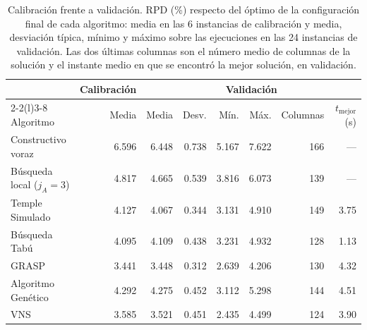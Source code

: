 \begin{table}[H]
\centering
\caption{Calibración frente a validación. RPD (\%) respecto del óptimo de la configuración final de cada algoritmo: media en las 6 instancias de calibración y media, desviación típica, mínimo y máximo sobre las ejecuciones en las 24 instancias de validación. Las dos últimas columnas son el número medio de columnas de la solución y el instante medio en que se encontró la mejor solución, en validación.}
\label{tab:validacion}
\begin{tabular}{@{}lrrrrrrr@{}}
\toprule
 & Calibración & \multicolumn{6}{c}{Validación} \\
\cmidrule(lr){2-2}\cmidrule(l){3-8}
Algoritmo & Media & Media & Desv. & Mín. & Máx. & Columnas & $t_{\text{mejor}}$ (s) \\ \midrule
Constructivo voraz & 6.596 & 6.448 & 0.738 & 5.167 & 7.622 & 166 & --- \\
Búsqueda local ($j_A=3$) & 4.817 & 4.665 & 0.539 & 3.816 & 6.073 & 139 & --- \\
\midrule
Temple Simulado & 4.127 & 4.067 & 0.344 & 3.131 & 4.910 & 149 & 3.75 \\
Búsqueda Tabú & 4.095 & 4.109 & 0.438 & 3.231 & 4.932 & 128 & 1.13 \\
GRASP & 3.441 & 3.448 & 0.312 & 2.639 & 4.206 & 130 & 4.32 \\
Algoritmo Genético & 4.292 & 4.275 & 0.452 & 3.112 & 5.298 & 144 & 4.51 \\
VNS & 3.585 & 3.521 & 0.451 & 2.435 & 4.499 & 124 & 3.90 \\
\bottomrule
\end{tabular}
\end{table}
